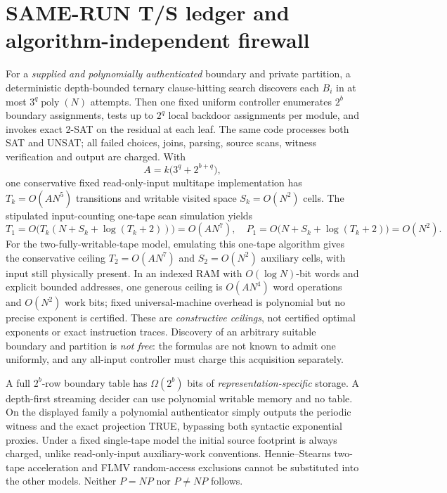 \documentclass[11pt]{article}
\begin{document}
\section{SAME-RUN T/S ledger and algorithm-independent firewall}
For a \emph{supplied and polynomially authenticated} boundary and private partition, a deterministic depth-bounded ternary clause-hitting search discovers each $B_i$ in at most $3^q\operatorname{poly}(N)$ attempts. Then one fixed uniform controller enumerates $2^b$ boundary assignments, tests up to $2^q$ local backdoor assignments per module, and invokes exact 2-SAT on the residual at each leaf. The same code processes both SAT and UNSAT; all failed choices, joins, parsing, source scans, witness verification and output are charged. With
\[A=k\bigl(3^q+2^{b+q}\bigr),\]
one conservative fixed read-only-input multitape implementation has $T_k=O(AN^5)$ transitions and writable visited space $S_k=O(N^2)$ cells. The stipulated input-counting one-tape scan simulation yields
\[
T_1=O\bigl(T_k(N+S_k+\log(T_k+2))\bigr)=O(AN^7),\quad
P_1=O\bigl(N+S_k+\log(T_k+2)\bigr)=O(N^2).
\]
For the two-fully-writable-tape model, emulating this one-tape algorithm gives the conservative ceiling $T_2=O(AN^7)$ and $S_2=O(N^2)$ auxiliary cells, with input still physically present. In an indexed RAM with $O(\log N)$-bit words and explicit bounded addresses, one generous ceiling is $O(AN^4)$ word operations and $O(N^2)$ work bits; fixed universal-machine overhead is polynomial but no precise exponent is certified. These are \emph{constructive ceilings}, not certified optimal exponents or exact instruction traces. Discovery of an arbitrary suitable boundary and partition is \emph{not free}: the formulas are not known to admit one uniformly, and any all-input controller must charge this acquisition separately.

A full $2^b$-row boundary table has $\Omega(2^b)$ bits of \emph{representation-specific} storage. A depth-first streaming decider can use polynomial writable memory and no table. On the displayed family a polynomial authenticator simply outputs the periodic witness and the exact projection TRUE, bypassing both syntactic exponential proxies. Under a fixed single-tape model the initial source footprint is always charged, unlike read-only-input auxiliary-work conventions. Hennie--Stearns two-tape acceleration and FLMV random-access exclusions cannot be substituted into the other models. Neither $P=NP$ nor $P\ne NP$ follows.
\end{document}
